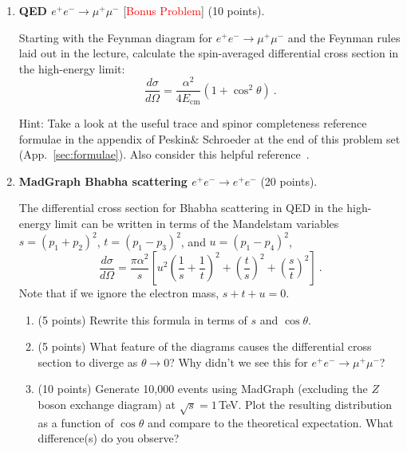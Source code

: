 \documentclass[12pt]{article}
\newif\ifsol
\newcommand{\solColor}{blue}
\newenvironment{solution}{\ifsol\color{\solColor}}{\fi}
\begin{document}
\begin{enumerate}

\item \textbf{QED $e^+e^- \to\mu^+\mu^-$} 
[\textcolor{red}{Bonus Problem}] (10 points).

Starting with the Feynman diagram for $e^+e^-\to\mu^+\mu^-$ and the Feynman rules laid out in the lecture, calculate the spin-averaged differential cross section in the high-energy limit:
\begin{equation}
    \frac{d\sigma}{d\Omega} = \frac{\alpha^2}{4E_\mathrm{cm}}(1+\cos^2\theta)~.
\end{equation}

Hint: Take a look at the useful trace and spinor completeness reference formulae in the appendix of Peskin\& Schroeder at the end of this problem set (App.~\ref{sec:formulae}). Also consider this helpful reference~\cite{kumericki2016feynman}.

\begin{solution}


\end{solution}

\item \textbf{MadGraph Bhabha scattering $e^+e^- \to e^+e^-$} (20 points).

The differential cross section for Bhabha scattering in QED in the high-energy limit can be written in terms of the Mandelstam variables $s = (p_1 + p_2)^2$, $t = (p_1-p_3)^2$, and $u = (p_1-p_4)^2$,
\begin{equation}
\frac{d\sigma}{d\Omega} = \frac{\pi \alpha^2}{s}\left [ u^2\left (\frac{1}{s} + \frac{1}{t}\right)^2 +  \left(\frac{t}{s}\right)^2 +  \left(\frac{s}{t}\right)^2 \right ]~.
\end{equation}
Note that if we ignore the electron mass, $s + t + u = 0$. 

\begin{enumerate}
    \item (5 points) Rewrite this formula in terms of $s$ and $\cos\theta$.
    \item (5 points) What feature of the diagrams causes the differential cross section to diverge as $\theta\to 0$? 
    Why didn't we see this for $e^+e^-\to \mu^+\mu^-$?
    \item (10 points) Generate 10,000 events using MadGraph (excluding the $Z$ boson exchange diagram) at $\sqrt{s}=1$\,TeV. 
    Plot the resulting distribution as a function of $\cos\theta$ and compare to the theoretical expectation.
    What difference(s) do you observe?
\end{enumerate}


\end{enumerate}
\end{document}
